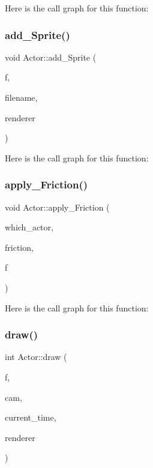 Here is the call graph for this function\+:
\mbox{\label{namespace_actor_ac479244aa3bada035abc9548ba604bfb}} 
\subsubsection{\texorpdfstring{add\+\_\+\+Sprite()}{add\_Sprite()}}
{\footnotesize\ttfamily void Actor\+::add\+\_\+\+Sprite (\begin{DoxyParamCaption}\item[{\mbox{\hyperlink{struct_actor_1_1_factory}{Factory}} $\ast$}]{f,  }\item[{const char $\ast$}]{filename,  }\item[{S\+D\+L\+\_\+\+Renderer $\ast$}]{renderer }\end{DoxyParamCaption})}

Here is the call graph for this function\+:
\mbox{\label{namespace_actor_aed5de159bbc7075229cbf6e187d906c7}} 
\subsubsection{\texorpdfstring{apply\+\_\+\+Friction()}{apply\_Friction()}}
{\footnotesize\ttfamily void Actor\+::apply\+\_\+\+Friction (\begin{DoxyParamCaption}\item[{int}]{which\+\_\+actor,  }\item[{const \mbox{\hyperlink{struct_vec2_d_1_1_vec2_d}{Vec2\+D\+::\+Vec2D}} $\ast$}]{friction,  }\item[{\mbox{\hyperlink{struct_actor_1_1_factory}{Factory}} $\ast$}]{f }\end{DoxyParamCaption})}

Here is the call graph for this function\+:
\mbox{\label{namespace_actor_a5e098b8721cbebeb27de076a98107368}} 
\subsubsection{\texorpdfstring{draw()}{draw()}}
{\footnotesize\ttfamily int Actor\+::draw (\begin{DoxyParamCaption}\item[{const \mbox{\hyperlink{struct_actor_1_1_factory}{Factory}} $\ast$}]{f,  }\item[{\mbox{\hyperlink{struct_grid___camera_1_1_grid___camera}{Grid\+\_\+\+Camera\+::\+Grid\+\_\+\+Camera}} $\ast$}]{cam,  }\item[{unsigned int}]{current\+\_\+time,  }\item[{S\+D\+L\+\_\+\+Renderer $\ast$}]{renderer }\end{DoxyParamCaption})}

